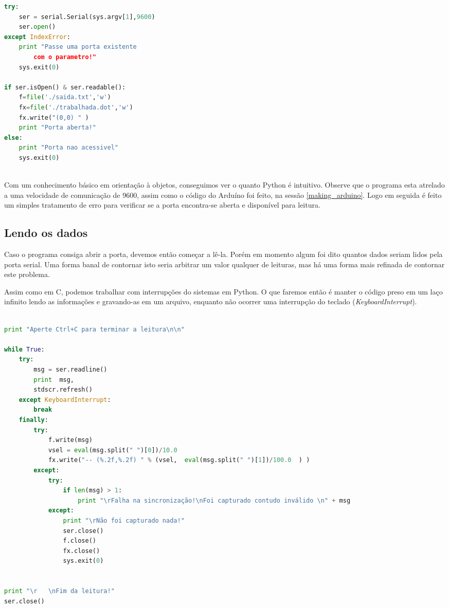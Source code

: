 \begin{multicols}{2}
\begin{lstlisting}[basicstyle=\ttfamily,language=Python,numbers=none,caption={[Acessando a porta serial]Acessando a porta serial}]
try:
	ser = serial.Serial(sys.argv[1],9600)
	ser.open()
except IndexError:
	print "Passe uma porta existente 
		com o parametro!"
	sys.exit(0)

if ser.isOpen() & ser.readable():
	f=file('./saida.txt','w')
	fx=file('./trabalhada.dot','w')
	fx.write("(0,0) " )
	print "Porta aberta!"
else:
	print "Porta nao acessivel"
	sys.exit(0)
	
\end{lstlisting}
Com um conhecimento básico em orientação à objetos, conseguimos ver o quanto Python é intuitivo. Observe que o programa esta atrelado a uma velocidade de comunicação de 9600, assim como o código do Arduíno foi feito, na sessão \ref{making_arduino}. Logo em seguida é feito um simples tratamento de erro para verificar se a porta encontra-se aberta e disponível para leitura.

\subsection{Lendo os dados}\label{reading}


Caso o programa consiga abrir a porta, devemos então começar a lê-la. Porém em momento algum foi dito quantos dados seriam lidos pela porta serial. Uma forma banal de contornar isto seria arbitrar um valor qualquer de leituras, mas há uma forma mais refinada de contornar este problema.

Assim como em C, podemos trabalhar com interrupções do sistemas em Python. O que faremos então é manter o código preso em um laço infinito lendo as informações e gravando-as em um arquivo, enquanto não ocorrer uma interrupção do teclado (\textit{KeyboardInterrupt}).

\begin{lstlisting}[basicstyle=\ttfamily,language=Python,numbers=none,caption={[Lendo dados]Lendo dados ininterruptamente}]

print "Aperte Ctrl+C para terminar a leitura\n\n"

while True:
	try:
		msg = ser.readline()
		print  msg,
		stdscr.refresh()
	except KeyboardInterrupt:
		break	
	finally:
		try:
			f.write(msg)
			vsel = eval(msg.split(" ")[0])/10.0
			fx.write("-- (%.2f,%.2f) " % (vsel,  eval(msg.split(" ")[1])/100.0  ) )
		except:
			try:
				if len(msg) > 1:
					print "\rFalha na sincronização!\nFoi capturado contudo inválido \n" + msg 
			except:
				print "\rNão foi capturado nada!"
				ser.close()
				f.close()
				fx.close()
				sys.exit(0)


print "\r   \nFim da leitura!"
ser.close()


\end{lstlisting}
\end{multicols}
